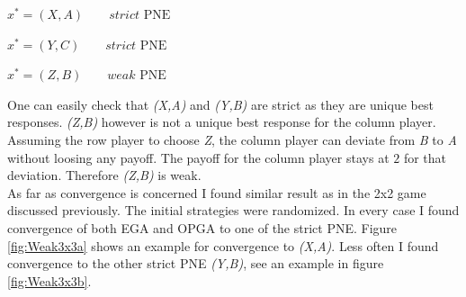 \begin{description}\centering
    \item $x^{*} = (X,A) \qquad \textit{strict }\text{PNE}$
    \item $x^{*} = (Y,C) \qquad \textit{strict }\text{PNE}$
    \item $x^{*} = (Z,B) \qquad \textit{weak }\text{PNE}$
\end{description}

One can easily check that \textit{(X,A)} and \textit{(Y,B)} are strict as they are unique best responses. \textit{(Z,B)} however is not a unique best response for the column player. Assuming the row player to choose \textit{Z}, the column player can deviate from \textit{B} to \textit{A} without loosing any payoff. The payoff for the column player stays at $2$ for that deviation. Therefore \textit{(Z,B)} is weak. \\

As far as convergence is concerned I found similar result as in the 2x2 game discussed previously. The initial strategies were randomized. In every case I found convergence of both EGA and OPGA to one of the strict PNE. Figure \ref{fig:Weak3x3a} shows an example for convergence to \textit{(X,A)}. Less often I found convergence to the other strict PNE \textit{(Y,B)}, see an example in figure \ref{fig:Weak3x3b}. 

